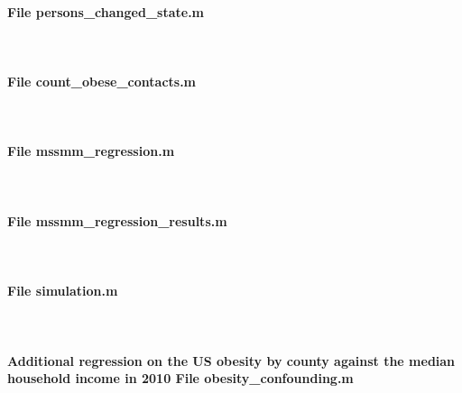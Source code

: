 \documentclass[11pt]{article}
\begin{document}
\paragraph{File persons\_changed\_state.m} \


\paragraph{File count\_obese\_contacts.m} \


\paragraph{File mssmm\_regression.m} \


\paragraph{File mssmm\_regression\_results.m} \


\paragraph{File simulation.m} \


\paragraph{Additional regression on the US obesity by county against the median household income in 2010 File obesity\_confounding.m} \

\end{document}
